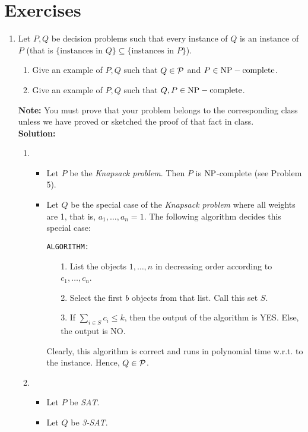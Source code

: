 \section{Exercises}

\begin{enumerate}
\item Let $P,Q$ be decision problems such that every instance of $Q$ is an instance of $P$ {\color{black}(that is $\{\text{instances in $Q$}\}\subseteq \{\text{instances in $P$}\}$)}.
\begin{enumerate}
	\item Give an example of $P,Q$ such that $Q\in {\mathcal{P}}$ and $P\in \mbox{NP}-\mbox{complete}$. 
		\item Give an example of $P,Q$ such that $Q,P\in \mbox{NP}-\mbox{complete}$. 
\end{enumerate} 

{\bf Note:} You must prove that your problem belongs to the corresponding class unless we have proved or sketched the proof of that fact in class.\\ 

{\bf \Large Solution:}\\

\begin{enumerate}
	\item \begin{itemize}
		\item Let $P$ be the {\em Knapsack problem}. Then $P$ is $\mbox{NP}$-complete (see Problem 5).
		\item Let $Q$ be the special case of the {\em Knapsack problem} where all weights are 1, that is, $a_1,\dots,a_n=1$. The following algorithm decides this special case:
		
			{\tt ALGORITHM:}
			
			\begin{itemize}
				\item[1.] List the objects $1,\dots,n$ in decreasing order according to $c_1,\dots,c_n$.
				\item[2.] Select the first $b$ objects from that list. Call this set $S$.
				\item[3.] If $\sum_{i\in S}c_i\leq k$, then  the output of the algorithm is YES. Else, the output is NO. 
			\end{itemize}
			
			Clearly, this algorithm is correct and runs in polynomial time w.r.t. to the instance. Hence, $Q\in{\mathcal{P}}$.
			
	\end{itemize}
	\item \begin{itemize}
		\item Let $P$ be {\em SAT}.
		\item Let $Q$ be {\em 3-SAT}.
	\end{itemize}
	

\end{enumerate}
\end{enumerate}
